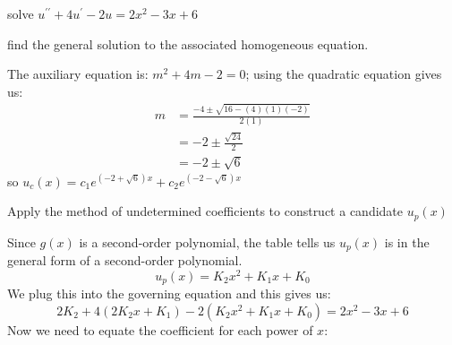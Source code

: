 \vspace{0.5cm}

 solve $u^{\prime \prime}+4u^{\prime}-2u = 2x^2 - 3x + 6$

\vspace{0.25cm}
 find the general solution to the associated homogeneous equation.

\vspace{0.25cm}

\noindent The auxiliary equation is: $m^2 + 4m-2=0$; using the quadratic equation gives us: 
\begin{align*}
m &= \frac{-4 \pm \sqrt{16 - (4)(1)(-2)}}{2(1)} \\
&= -2 \pm \frac{\sqrt{24}}{2} \\
&= -2 \pm \sqrt{6}
\end{align*}
so $u_c(x) = c_1e^{(-2+\sqrt{6})x}+c_2e^{(-2-\sqrt{6})x}$

\vspace{0.25cm}
 Apply the method of undetermined coefficients to construct a candidate $u_p(x)$

\vspace{0.25cm}

\noindent Since $g(x)$ is a second-order polynomial, the table tells us $u_p(x)$ is in the general form of a second-order polynomial.
$$u_p(x) = K_2x^2+K_1x+K_0$$
We plug this into the governing equation and this gives us:
\begin{equation*}
2K_2 + 4(2K_2x+K_1) - 2(K_2x^2+K_1x+K_0) = 2x^2-3x+6
\end{equation*}
Now we need to equate the coefficient for each power of $x$:


